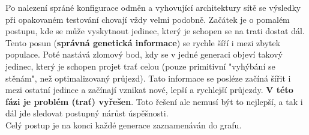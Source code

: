 \documentclass[a4paper,12pt]{article}
\begin{document}
            Po nalezení spráné konfigurace odměn a vyhovující architektury sítě
            se výsledky při opakovaném testování chovají vždy velmi podobně.
            Začátek je o pomalém postupu, kde se může vyskytnout jedinec, který
            je schopen se na trati dostat dál. Tento posun (\textbf{správná genetická informace})
            se rychle šíří i mezi zbytek populace. Poté nastává zlomový bod, kdy se
            v jedné generaci objeví takový jedinec, který je schopen projet trať celou
            (pouze primitivní "vyhýbání se stěnám", než optimalizovaný průjezd). 
            Tato informace se posléze začíná šířit i mezi ostatní jedince a začínají vznikat nové,
            lepší a rychlejší průjezdy. \textbf{V této fázi je problém (trať) vyřešen}.
            Toto řešení ale nemusí být to nejlepší, a tak i dál jde sledovat postupný nárůst
            úspěšnosti.\\
            Celý postup je na konci každé generace zaznamenáván do grafu.
\end{document}
